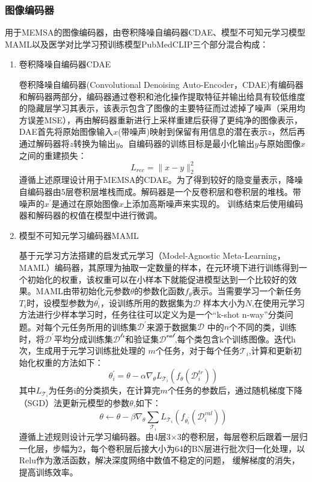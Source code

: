 \subsubsection*{图像编码器}
用于MEMSA的图像编码器，由卷积降噪自编码器CDAE、模型不可知元学习模型MAML以及医学对比学习预训练模型PubMedCLIP三个部分混合构成：
\begin{enumerate}[topsep = 0 pt, itemsep= 0 pt, parsep=0pt, partopsep=0pt, leftmargin=0pt, itemindent=44pt, labelsep=6pt, listparindent=22pt, label=(\arabic*)]
	\item 卷积降噪自编码器CDAE
	
	卷积降噪自编码器(Convolutional Denoising Auto-Encoder，CDAE)有编码器和解码器两部分，编码器通过卷积和池化操作提取特征并输出给具有较低维度的隐藏层学习其表示，该表示包含了图像的主要特征而过滤掉了噪声（采用均方误差MSE），再由解码器重新进行上采样重建后获得了更纯净的图像表示，
	DAE首先将原始图像输入$x$(带噪声)映射到保留有用信息的潜在表示$z$，然后再通过解码器将$z$转换为输出$y$。自编码器的训练目标是最小化输出$y$与原始图像$x$之间的重建损失：
	\begin{equation}
		\label{}
		L_{r e c}=\|x-y\|_2^2	
	\end{equation}
	遵循上述原理设计用于MEMSA的CDAE。为了得到较好的隐变量表示，降噪自编码器由5层卷积层堆栈而成。解码器是一个反卷积层和卷积层的堆栈。带噪声的$x^{\prime}$是通过在原始图像$x$上添加高斯噪声来实现的。
	训练结束后使用编码器和解码器的权值在模型中进行微调。

	\item 模型不可知元学习编码器MAML
	
	基于元学习方法搭建的启发式元学习（Model-Agnostic Meta-Learning，MAML）编码器，其原理为抽取一定数量的样本，在元环境下进行训练得到一个初始化的权重，该权重可以在小样本下就能促进模型达到一个比较好的效果。MAML由带初始化元参数$\theta$的参数化函数$f_\theta$表示。当需要学习一个新任务$T_i$时，设模型参数为$\theta_i^{\prime}$，设训练所用的数据集为$\mathcal{D}$
	样本大小为$N$,在使用元学习方法进行少样本学习时，任务往往可以定义为是一个“k-shot n-way”分类问题。对每个元任务所用的训练集$\mathcal{D^{\prime}}$来源于数据集$\mathcal{D}$
	中的$n$个不同的类，训练时，将$\mathcal{D^{\prime}}$平均分成训练集$\mathcal{D^{tr}}$和验证集$\mathcal{D^{val}}$,每个类包含k个训练图像。迭代h次，生成用于元学习训练批处理的
	$m$个任务，对于每个任务$\mathcal{T}_i$,计算和更新初始化权重的方法如下：
	\begin{equation}
		\label{}
		\theta_i^{\prime}=\theta-\alpha \nabla_\theta L_{\mathcal{T}_i}\left(f_\theta\left(\mathcal{D}_i^{t r}\right)\right)
	\end{equation}
	其中$L_{\mathcal{T}_i}$为任务i的分类损失，在计算完$m$个任务的参数后，通过随机梯度下降（SGD）法更新元模型的参数$\theta$,如下：
	\begin{equation}
		\label{}
		\theta \leftarrow \theta-\beta \nabla_\theta \sum_{\mathcal{T}_i} L_{\mathcal{T}_i}\left(f_{\theta_i^{\prime}}\left(\mathcal{D}_i^{v a l}\right)\right)
	\end{equation}
	遵循上述规则设计元学习编码器。由4层3×3的卷积层，每层卷积后跟着一层归一化层，步幅为2，每个卷积层后接大小为64的BN层进行批次归一化处理，以Relu作为激活函数，解决深度网络中数值不稳定的问题，
	缓解梯度的消失，提高训练效率。


\end{enumerate}
